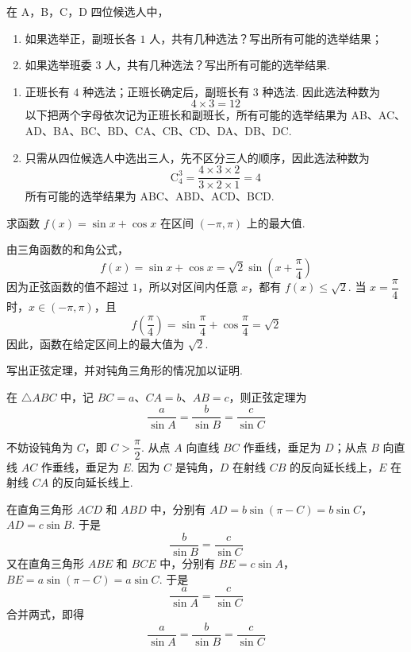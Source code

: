 \begin{problem}
在 A，B，C，D 四位候选人中，

\begin{enumerate}
\item 如果选举正，副班长各 \(1\text{ 人}\)，共有几种选法？写出所有可能的选举结果；
\item 如果选举班委 \(3\text{ 人}\)，共有几种选法？写出所有可能的选举结果.
\end{enumerate}
\end{problem}

\begin{solution}
\begin{enumerate}
\item 正班长有 \(4\) 种选法；正班长确定后，副班长有 \(3\) 种选法. 因此选法种数为
\[
4\times3=12
\]
以下把两个字母依次记为正班长和副班长，所有可能的选举结果为 AB、AC、AD、BA、BC、BD、CA、CB、CD、DA、DB、DC.
\item 只需从四位候选人中选出三人，先不区分三人的顺序，因此选法种数为
\[
\mathrm C_4^3=\frac{4\times3\times2}{3\times2\times1}=4
\]
所有可能的选举结果为 ABC、ABD、ACD、BCD.
\end{enumerate}
\end{solution}

\begin{problem}
求函数 \(f(x)=\sin x+\cos x\) 在区间 \((-\pi,\pi)\) 上的最大值.
\end{problem}

\begin{solution}
由三角函数的和角公式，
\[
f(x)=\sin x+\cos x=\sqrt{2}\sin\left(x+\frac{\pi}{4}\right)
\]
因为正弦函数的值不超过 \(1\)，所以对区间内任意 \(x\)，都有 \(f(x)\le\sqrt{2}\). 当 \(x=\dfrac{\pi}{4}\) 时，\(x\in(-\pi,\pi)\)，且
\[
f\left(\frac{\pi}{4}\right)=\sin\frac{\pi}{4}+\cos\frac{\pi}{4}=\sqrt{2}
\]
因此，函数在给定区间上的最大值为 \(\sqrt{2}\).
\end{solution}

\begin{problem}
写出正弦定理，并对钝角三角形的情况加以证明.
\end{problem}

\begin{solution}
在 \(\triangle ABC\) 中，记 \(BC=a\)、\(CA=b\)、\(AB=c\)，则正弦定理为
\[
\frac{a}{\sin A}=\frac{b}{\sin B}=\frac{c}{\sin C}
\]

不妨设钝角为 \(C\)，即 \(C>\dfrac{\pi}{2}\). 从点 \(A\) 向直线 \(BC\) 作垂线，垂足为 \(D\)；从点 \(B\) 向直线 \(AC\) 作垂线，垂足为 \(E\). 因为 \(C\) 是钝角，\(D\) 在射线 \(CB\) 的反向延长线上，\(E\) 在射线 \(CA\) 的反向延长线上.

在直角三角形 \(ACD\) 和 \(ABD\) 中，分别有
\(AD=b\sin(\pi-C)=b\sin C\)，\(AD=c\sin B\).
于是
\[
\frac{b}{\sin B}=\frac{c}{\sin C}
\]
又在直角三角形 \(ABE\) 和 \(BCE\) 中，分别有
\(BE=c\sin A\)，\(BE=a\sin(\pi-C)=a\sin C\).
于是
\[
\frac{a}{\sin A}=\frac{c}{\sin C}
\]
合并两式，即得
\[
\frac{a}{\sin A}=\frac{b}{\sin B}=\frac{c}{\sin C}
\]
\end{solution}


